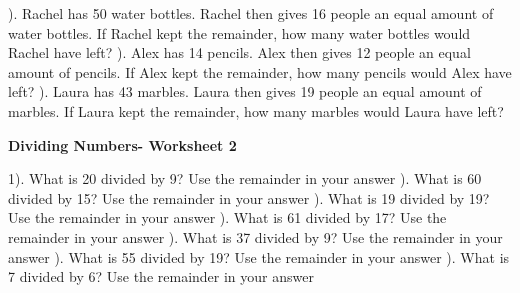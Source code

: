 \documentclass{article}%
\begin{document}
). Rachel has 50 water bottles. Rachel then gives 16 people an equal amount of water bottles. If Rachel kept the remainder, how many water bottles would Rachel have left?%
\newline%
\newline%
). Alex has 14 pencils. Alex then gives 12 people an equal amount of pencils. If Alex kept the remainder, how many pencils would Alex have left?%
\newline%
\newline%
). Laura has 43 marbles. Laura then gives 19 people an equal amount of marbles. If Laura kept the remainder, how many marbles would Laura have left?%
\newline%
\newline%
\newline%
\pagebreak%
\large%
\begin{center}%
\textbf{Dividing Numbers- Worksheet 2}%
\newline%
\end{center} \normalsize%
1). What is 20 divided by 9? Use the remainder in your answer%
\newline%
\newline%
). What is 60 divided by 15? Use the remainder in your answer%
\newline%
\newline%
). What is 19 divided by 19? Use the remainder in your answer%
\newline%
\newline%
). What is 61 divided by 17? Use the remainder in your answer%
\newline%
\newline%
). What is 37 divided by 9? Use the remainder in your answer%
\newline%
\newline%
). What is 55 divided by 19? Use the remainder in your answer%
\newline%
\newline%
). What is 7 divided by 6? Use the remainder in your answer%
\newline%
\end{document}

